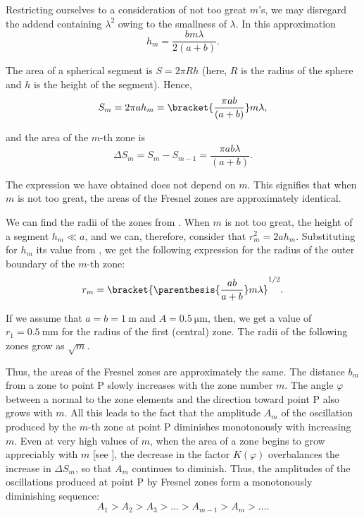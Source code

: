 \noindent
Restricting ourselves to a consideration of not too great $m$'s, we may disregard the addend containing $\lambda^2$ owing to the smallness of $\lambda$.
In this approximation
\begin{equation}\label{eq:18_7}
    h_m = \frac{bm\lambda}{2(a+b)}.
\end{equation}

The area of a spherical segment is $S=2\pi Rh$ (here, $R$ is the radius of the sphere and $h$ is the height of the segment).
Hence,
\begin{equation*}
    S_m = 2\pi a h_m = \bracket{\frac{\pi a b}{(a+b)}} m \lambda,
\end{equation*}

\noindent
and the area of the $m$-th zone is
\begin{equation*}
    \Delta{S_m} = S_m - S_{m-1} = \frac{\pi a b \lambda}{(a+b)}.
\end{equation*}

\noindent
The expression we have obtained does not depend on $m$.
This signifies that when $m$ is not too great, the areas of the Fresnel zones are approximately identical.

We can find the radii of the zones from .
When $m$ is not too great, the height of a segment $h_m\ll a$, and we can, therefore, consider that $r_m^2= 2ah_m$.
Substituting for $h_m$ its value from ,
we get the following expression for the radius of the outer boundary of the $m$-th zone:
\begin{equation}\label{eq:18_8}
    r_m = \bracket{ \parenthesis{ \frac{ab}{a+b} } m \lambda }^{1/2}.
\end{equation}

\noindent
If we assume that $a=b=\SI{1}{\metre}$ and $A=\SI{0.5}{\micro\metre}$, then, we get a value of $r_1=\SI{0.5}{\milli\metre}$ for the radius of the first (central) zone.
The radii of the following zones grow as $\sqrt{m}$.

Thus, the areas of the Fresnel zones are approximately the same.
The distance $b_m$ from a zone to point P slowly increases with the zone number $m$.
The angle $\varphi$ between a normal to the zone elements and the direction toward point P also grows with $m$.
All this leads to the fact that the amplitude $A_m$ of the oscillation produced by the $m$-th zone at point P diminishes monotonously with increasing $m$.
Even at very high values of $m$, when the area of a zone begins to grow appreciably with $m$ [see ], the decrease in the factor $K(\varphi)$ overbalances the increase in $\Delta{S_m}$, so that $A_m$ continues to diminish.
Thus, the amplitudes of the oscillations produced at point P by Fresnel zones form a monotonously diminishing sequence:
\begin{equation*}
    A_1 > A_2 > A_3 > \ldots > A_{m-1} > A_m > \ldots .
\end{equation*}


